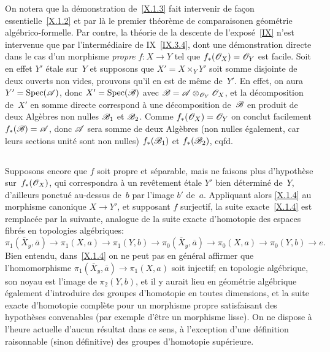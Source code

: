 \begin{remarques}
\label{X.1.5}
On notera que la d\'emonstration de~\ref{X.1.3} fait intervenir de
fa\c con essentielle~\ref{X.1.2} et par l\`a le \og premier
th\'eor\`eme de comparaison\fg en g\'eom\'etrie
alg\'ebrico-formelle. Par contre, la th\'eorie de la descente de
l'expos\'e~\ref{IX}
n'est intervenue que par l'interm\'ediaire de IX~\ref{IX.3.4}, dont
une d\'emonstration directe dans le cas d'un morphisme \emph{propre}
$f\colon X\to Y$ tel que $f_*(\cal{O}_X)=\cal{O}_Y$ est facile. Soit
en effet $Y'$ \'etale sur~$Y$ et supposons que $X' = X\times_Y Y'$
soit somme disjointe de deux ouverts non vides, prouvons qu'il en est
de m\^eme de~$Y'$. En effet, on aura $Y'=\Spec(\cal{A})$, donc
$X'=\Spec(\cal{B})$ avec $\cal{B}=\cal{A}\otimes_{\cal{O}_Y}
\cal{O}_X$, et la d\'ecomposition de~$X'$ en somme directe
correspond \`a une d\'ecomposition de~$\cal{B}$ en produit de deux
Alg\`ebres non nulles $\cal{B}_1$ et $\cal{B}_2$. Comme
$f_*(\cal{O}_X)=\cal{O}_Y$ on conclut facilement
$f_*(\cal{B})=\cal{A}$, donc $\cal{A}$ sera somme de deux Alg\`ebres
(non nulles \'egalement, car leurs sections unit\'e sont non
nulles) $f_*(\cal{B}_1)$ et $f_*(\cal{B}_2)$, cqfd.
\end{remarques}

\subsection{}
\label{X.I.6}
Supposons encore que $f$ soit propre et s\'eparable, mais ne faisons
plus d'hypoth\`ese sur~$f_*(\cal{O}_X)$, qui correspondra \`a un
rev\^etement \'etale $Y'$ bien d\'etermin\'e de~$Y$,
d'ailleurs ponctu\'e au-dessus de~$b$ par l'image $b'$
de~$a$. Appliquant alors \ref{X.1.4} au morphisme canonique $X\to Y'$,
et supposant $f$ surjectif, la suite exacte~\ref{X.1.4} est
remplac\'ee par la suivante, analogue de la suite exacte d'homotopie
des espaces fibr\'es en topologies alg\'ebriques:
$$
\pi_1(\overline X_y,\overline a)\to \pi_1(X,a)\to \pi_1(Y,b)\to
\pi_0(\overline X_y,\overline a)\to \pi_0(X,a)\to \pi_0(Y,b)\to e.
$$
Bien entendu, dans~\ref{X.1.4} on ne peut pas en g\'en\'eral
affirmer que l'homomorphisme
$\pi_1(\overline X_y,\overline a)\to \pi_1(X,a)$
soit injectif; en topologie alg\'ebrique, son noyau est l'image de
$\pi_2(Y,b)$, et il y aurait lieu en g\'eom\'etrie alg\'ebrique
\'egalement d'introduire des groupes d'homotopie en toutes
dimensions, et la suite exacte d'homotopie compl\`ete pour un
morphisme propre satisfaisant des hypoth\`eses convenables (par
exemple d'\^etre un morphisme
lisse).
On ne dispose \`a l'heure
actuelle d'aucun r\'esultat dans ce sens, \`a l'exception d'une
d\'efinition raisonnable (sinon d\'efinitive) des groupes
d'homotopie sup\'erieure.

